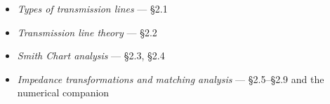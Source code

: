 \begin{itemize}
  \item \textit{Types of transmission lines} --- \S2.1 \checkmark
  \item \textit{Transmission line theory} --- \S2.2 \checkmark
  \item \textit{Smith Chart analysis} --- \S2.3, \S2.4 \checkmark
  \item \textit{Impedance transformations and matching analysis} --- \S2.5--\S2.9
    and the numerical companion \checkmark
\end{itemize}

\vspace{2pt}
